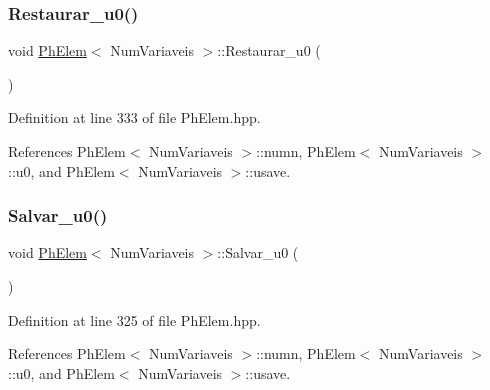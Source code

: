 \mbox{\label{classPhElem_a7094a0e8767868c583cc948e56214a9d}} 
\subsubsection{\texorpdfstring{Restaurar\+\_\+u0()}{Restaurar\_u0()}}
{\footnotesize\ttfamily void \hyperlink{classPhElem}{Ph\+Elem}$<$ Num\+Variaveis $>$\+::Restaurar\+\_\+u0 (\begin{DoxyParamCaption}{ }\end{DoxyParamCaption})\hspace{0.3cm}{\ttfamily [inherited]}}



Definition at line 333 of file Ph\+Elem.\+hpp.



References Ph\+Elem$<$ Num\+Variaveis $>$\+::numn, Ph\+Elem$<$ Num\+Variaveis $>$\+::u0, and Ph\+Elem$<$ Num\+Variaveis $>$\+::usave.

\mbox{\label{classPhElem_ab6765ea1fa41b3a2d565d86872d6e7e6}} 
\subsubsection{\texorpdfstring{Salvar\+\_\+u0()}{Salvar\_u0()}}
{\footnotesize\ttfamily void \hyperlink{classPhElem}{Ph\+Elem}$<$ Num\+Variaveis $>$\+::Salvar\+\_\+u0 (\begin{DoxyParamCaption}{ }\end{DoxyParamCaption})\hspace{0.3cm}{\ttfamily [inherited]}}



Definition at line 325 of file Ph\+Elem.\+hpp.



References Ph\+Elem$<$ Num\+Variaveis $>$\+::numn, Ph\+Elem$<$ Num\+Variaveis $>$\+::u0, and Ph\+Elem$<$ Num\+Variaveis $>$\+::usave.

\mbox{\label{classPhElem_a05b05802884ecd42ed42e46108a0d5b1}} 
